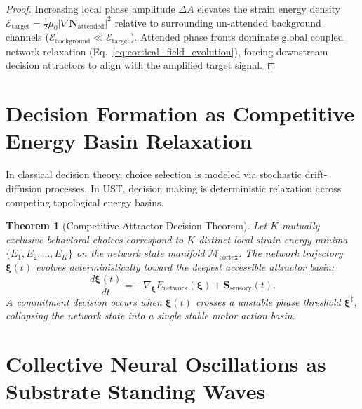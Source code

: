 \documentclass[11pt,a4paper]{article}
\newtheorem{thm}{Theorem}
\begin{document}
	\begin{proof}
		Increasing local phase amplitude $\Delta A$ elevates the strain energy density $\mathcal{E}_{\text{target}} = \frac{1}{2}\mu_0 |\nabla \mathbf{N}_{\text{attended}}|^2$ relative to surrounding un-attended background channels ($\mathcal{E}_{\text{background}} \ll \mathcal{E}_{\text{target}}$). Attended phase fronts dominate global coupled network relaxation (Eq.\ \ref{eq:cortical_field_evolution}), forcing downstream decision attractors to align with the amplified target signal.
	\end{proof}
	
	\section{Decision Formation as Competitive Energy Basin Relaxation}
	\label{sec:decision_formation}
	
	In classical decision theory, choice selection is modeled via stochastic drift-diffusion processes. In UST, decision making is deterministic relaxation across competing topological energy basins.
	
	\begin{thm}[Competitive Attractor Decision Theorem]
		\label{thm:decision_attractor}
		Let $K$ mutually exclusive behavioral choices correspond to $K$ distinct local strain energy minima $\{E_1, E_2, \dots, E_K\}$ on the network state manifold $\mathcal{M}_{\text{cortex}}$. The network trajectory $\boldsymbol{\xi}(t)$ evolves deterministically toward the deepest accessible attractor basin:
		\begin{equation}
			\frac{d \boldsymbol{\xi}(t)}{dt} = -\nabla_{\boldsymbol{\xi}} E_{\text{network}}(\boldsymbol{\xi}) + \mathbf{S}_{\text{sensory}}(t).
			\label{eq:attractor_basin_flow}
		\end{equation}
		A commitment decision occurs when $\boldsymbol{\xi}(t)$ crosses a unstable phase threshold $\boldsymbol{\xi}^\ddagger$, collapsing the network state into a single stable motor action basin.
	\end{thm}
	
	\section{Collective Neural Oscillations as Substrate Standing Waves}
	\label{sec:neural_oscillations}
	
\end{document}
